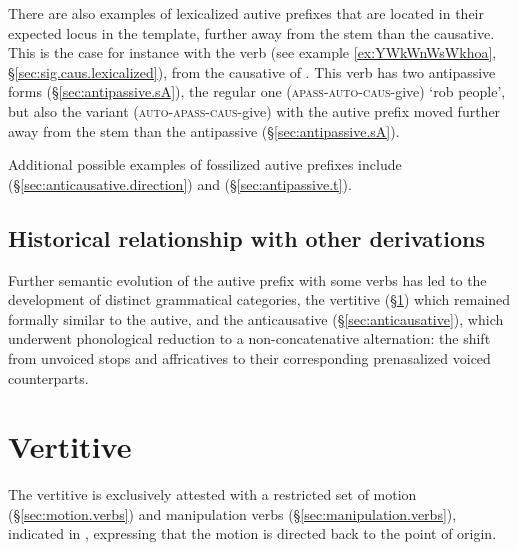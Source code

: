 There are also examples of lexicalized autive  prefixes that are located in their expected locus in the template, further away from the stem than the causative. This is the case for instance with the verb  (see example \ref{ex:YWkWnWsWkhoa}, §\ref{sec:sig.caus.lexicalized}), from the causative  of . This verb has two  antipassive forms (§\ref{sec:antipassive.sA}), the regular one  (\textsc{apass}-\textsc{auto}-\textsc{caus}-give) `rob people', but also the variant  (\textsc{auto}-\textsc{apass}-\textsc{caus}-give) with the autive prefix   moved further away from the stem than the antipassive  (§\ref{sec:antipassive.sA}).

Additional possible examples of fossilized autive prefixes include  (§\ref{sec:anticausative.direction}) and  (§\ref{sec:antipassive.t}).

\subsection{Historical relationship with other derivations} \label{sec:autoben.historical}
Further semantic evolution of the autive prefix with some verbs has led to the development of distinct grammatical categories, the vertitive  (§\ref{sec:vertitive}) which remained formally similar to the autive, and the anticausative (§\ref{sec:anticausative}), which underwent phonological reduction to a non-concatenative alternation: the shift from unvoiced stops and affricatives to their corresponding prenasalized voiced counterparts.
 
\section{Vertitive} \label{sec:vertitive} 
The vertitive   is exclusively attested with a restricted set of motion (§\ref{sec:motion.verbs}) and manipulation verbs (§\ref{sec:manipulation.verbs}), indicated in , expressing that the motion is directed back to the point of origin.
 
